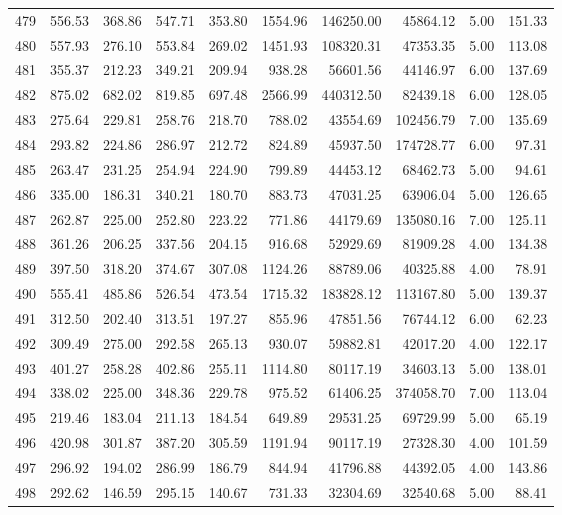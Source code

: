 \begin{tabular}{lrrrrrrrrr}
479 & 556.53 & 368.86 & 547.71 & 353.80 & 1554.96 & 146250.00 & 45864.12 & 5.00 & 151.33 \\
480 & 557.93 & 276.10 & 553.84 & 269.02 & 1451.93 & 108320.31 & 47353.35 & 5.00 & 113.08 \\
481 & 355.37 & 212.23 & 349.21 & 209.94 & 938.28 & 56601.56 & 44146.97 & 6.00 & 137.69 \\
482 & 875.02 & 682.02 & 819.85 & 697.48 & 2566.99 & 440312.50 & 82439.18 & 6.00 & 128.05 \\
483 & 275.64 & 229.81 & 258.76 & 218.70 & 788.02 & 43554.69 & 102456.79 & 7.00 & 135.69 \\
484 & 293.82 & 224.86 & 286.97 & 212.72 & 824.89 & 45937.50 & 174728.77 & 6.00 & 97.31 \\
485 & 263.47 & 231.25 & 254.94 & 224.90 & 799.89 & 44453.12 & 68462.73 & 5.00 & 94.61 \\
486 & 335.00 & 186.31 & 340.21 & 180.70 & 883.73 & 47031.25 & 63906.04 & 5.00 & 126.65 \\
487 & 262.87 & 225.00 & 252.80 & 223.22 & 771.86 & 44179.69 & 135080.16 & 7.00 & 125.11 \\
488 & 361.26 & 206.25 & 337.56 & 204.15 & 916.68 & 52929.69 & 81909.28 & 4.00 & 134.38 \\
489 & 397.50 & 318.20 & 374.67 & 307.08 & 1124.26 & 88789.06 & 40325.88 & 4.00 & 78.91 \\
490 & 555.41 & 485.86 & 526.54 & 473.54 & 1715.32 & 183828.12 & 113167.80 & 5.00 & 139.37 \\
491 & 312.50 & 202.40 & 313.51 & 197.27 & 855.96 & 47851.56 & 76744.12 & 6.00 & 62.23 \\
492 & 309.49 & 275.00 & 292.58 & 265.13 & 930.07 & 59882.81 & 42017.20 & 4.00 & 122.17 \\
493 & 401.27 & 258.28 & 402.86 & 255.11 & 1114.80 & 80117.19 & 34603.13 & 5.00 & 138.01 \\
494 & 338.02 & 225.00 & 348.36 & 229.78 & 975.52 & 61406.25 & 374058.70 & 7.00 & 113.04 \\
495 & 219.46 & 183.04 & 211.13 & 184.54 & 649.89 & 29531.25 & 69729.99 & 5.00 & 65.19 \\
496 & 420.98 & 301.87 & 387.20 & 305.59 & 1191.94 & 90117.19 & 27328.30 & 4.00 & 101.59 \\
497 & 296.92 & 194.02 & 286.99 & 186.79 & 844.94 & 41796.88 & 44392.05 & 4.00 & 143.86 \\
498 & 292.62 & 146.59 & 295.15 & 140.67 & 731.33 & 32304.69 & 32540.68 & 5.00 & 88.41 \\

\end{tabular}

